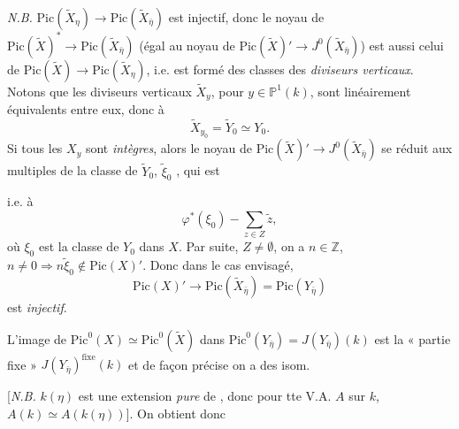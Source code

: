 \documentclass[11pt,a4paper]{article}
\begin{document}
\emph{N.B.} $\mathrm{Pic}(\tilde{X}_{\eta}) \to \mathrm{Pic}(\tilde{X}_{\bar{\eta}})$
est injectif, donc le noyau de
$\mathrm{Pic}(\tilde{X})^{*} \to \mathrm{Pic}(\tilde{X}_{\bar{\eta}})$
\struck{\ill{}} (égal au noyau de
$\mathrm{Pic}(\tilde{X})' \to J^{0}(\tilde{X}_{\bar{\eta}})$) est aussi
celui de $\mathrm{Pic}(\tilde{X}) \to \mathrm{Pic}(\tilde{X}_{\eta})$, i.e.
est formé des classes des \emph{diviseurs verticaux}.  Notons que les diviseurs verticaux $\tilde{X}_y$, pour
$y \in \mathbb{P}^{1}(k)$,  sont
linéairement équivalents entre eux, donc à
\[
  \tilde{X}_{y_0} = \tilde{Y}_0 \simeq Y_0 .
\]
 Si  tous les $X_y$ sont 
\struck{\ill{}} \emph{intègres}, alors le noyau de
$\mathrm{Pic}(\tilde{X})' \to J^{0}(\tilde{X}_{\bar{\eta}})$ se réduit aux
 multiples de  la classe
\struck{\ill{}} de $\tilde{Y}_0$,  $\tilde{\xi}_0$
, qui est

i.e. à
\[
  \varphi^{*}(\xi_0) - \sum_{z \in Z} \tilde{z} ,
\]
où $\xi_0$ est la classe de $Y_0$ dans $X$. Par suite, 
 $Z \neq \emptyset$, on a
$n \in \mathbb{Z}$, $n \neq 0 \Rightarrow n\tilde{\xi}_0 \notin \mathrm{Pic}(X)'$.
Donc dans le cas envisagé,
\[
  \mathrm{Pic}(X)' \longrightarrow \mathrm{Pic}(\tilde{X}_{\bar{\eta}}) = \mathrm{Pic}(Y_{\bar{\eta}})
\]
est \emph{injectif}.

L'image de $\mathrm{Pic}^{0}(X) \simeq \mathrm{Pic}^{0}(\tilde{X})$ dans
$\mathrm{Pic}^{0}(Y_{\bar{\eta}}) = J(Y_{\bar{\eta}})(k)$ est la « partie
fixe » $J(Y_{\bar{\eta}})^{\mathrm{fixe}}(k)$ et de façon précise on a des
isom.



[\emph{N.B.} \struck{\ill{}} $k(\eta)$ est une extension \emph{pure} de
, donc pour tte V.A. $A$ sur $k$,
$A(k) \simeq A(k(\eta))$]. On obtient donc
\end{document}
